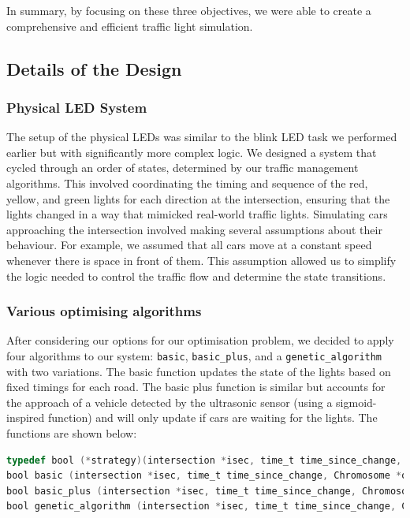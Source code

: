 \documentclass{article}
\begin{document}
In summary, by focusing on these three objectives, we were able to create a comprehensive and efficient traffic light simulation.


\subsection{Details of the Design}

\subsubsection{Physical LED System}
The setup of the physical LEDs was similar to the blink LED task we performed earlier but with significantly more complex logic. We designed a system that cycled through an order of states, determined by our traffic management algorithms. This involved coordinating the timing and sequence of the red, yellow, and green lights for each direction at the intersection, ensuring that the lights changed in a way that mimicked real-world traffic lights. Simulating cars approaching the intersection involved making several assumptions about their behaviour. For example, we assumed that all cars move at a constant speed whenever there is space in front of them. This assumption allowed us to simplify the logic needed to control the traffic flow and determine the state transitions.

\subsubsection{Various optimising algorithms}
After considering our options for our optimisation problem, we decided to apply four algorithms to our system: \verb|basic|, \verb|basic_plus|, and a \verb|genetic_algorithm| with two variations. The basic function updates the state of the lights based on fixed timings for each road. The basic plus function is similar but accounts for the approach of a vehicle detected by the ultrasonic sensor (using a sigmoid-inspired function) and will only update if cars are waiting for the lights. The functions are shown below:

\begin{lstlisting}[language=C, caption= The strategies and their parameters]
typedef bool (*strategy)(intersection *isec, time_t time_since_change, Chromosome *optimal_data);
bool basic (intersection *isec, time_t time_since_change, Chromosome *optimal_data);
bool basic_plus (intersection *isec, time_t time_since_change, Chromosome *optimal_data);
bool genetic_algorithm (intersection *isec, time_t time_since_change, Chromosome *optimal_data);
\end{lstlisting}
\end{document}
